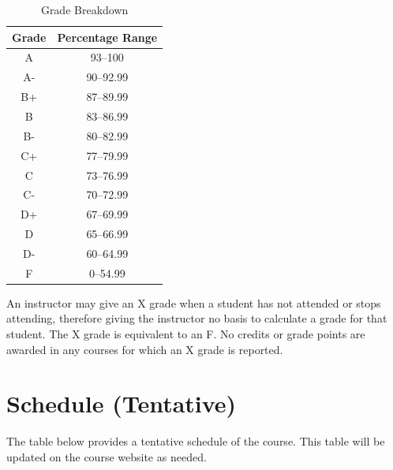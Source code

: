 \documentclass[11pt]{article}\usepackage[]{graphicx}\usepackage[]{xcolor}
\begin{document}
\begin{table}[h!]
\centering
\begin{tabular}{|c|c|}
\hline
\textbf{Grade} & \textbf{Percentage Range} \\
\hline
A  & 93--100 \\
A- & 90--92.99 \\\hline
B+ & 87--89.99 \\
B  & 83--86.99 \\
B- & 80--82.99 \\\hline
C+ & 77--79.99 \\
C  & 73--76.99 \\
C- & 70--72.99 \\\hline
D+ & 67--69.99 \\
D  & 65--66.99 \\
D- & 60--64.99 \\\hline
F  & 0--54.99 \\
\hline
\end{tabular}
\caption{Grade Breakdown}
\end{table}

An instructor may give an X grade when a student has not attended or stops attending, therefore giving the instructor no basis to calculate a grade for that student.
The X grade is equivalent to an F. 
No credits or grade points are awarded in any courses for which an X grade is reported.

\section{Schedule (Tentative)}

The table below provides a tentative schedule of the course. 
This table will be updated on the course website as needed.
\end{document}

